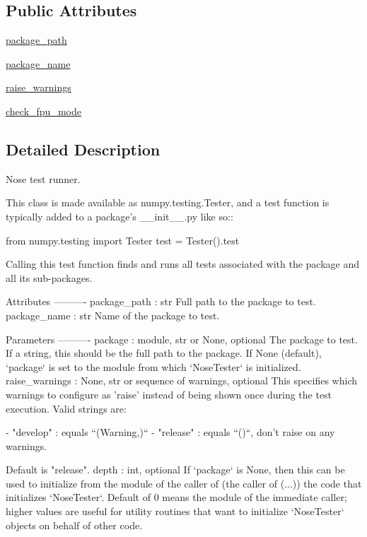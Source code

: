 \subsection*{Public Attributes}
\begin{DoxyCompactItemize}
\item 
\hyperlink{classnumpy_1_1testing_1_1__private_1_1nosetester_1_1NoseTester_ae21b7c07e4ef10572552634510d04c92}{package\+\_\+path}
\item 
\hyperlink{classnumpy_1_1testing_1_1__private_1_1nosetester_1_1NoseTester_ab51a1494d2ffd22593182eb4c5d8f456}{package\+\_\+name}
\item 
\hyperlink{classnumpy_1_1testing_1_1__private_1_1nosetester_1_1NoseTester_a6ea4848c8dc9cde3964f7e58298831a8}{raise\+\_\+warnings}
\item 
\hyperlink{classnumpy_1_1testing_1_1__private_1_1nosetester_1_1NoseTester_a2244951b799d844c57b9a0b19a1bbdb1}{check\+\_\+fpu\+\_\+mode}
\end{DoxyCompactItemize}


\subsection{Detailed Description}
\begin{DoxyVerb}Nose test runner.

This class is made available as numpy.testing.Tester, and a test function
is typically added to a package's __init__.py like so::

  from numpy.testing import Tester
  test = Tester().test

Calling this test function finds and runs all tests associated with the
package and all its sub-packages.

Attributes
----------
package_path : str
    Full path to the package to test.
package_name : str
    Name of the package to test.

Parameters
----------
package : module, str or None, optional
    The package to test. If a string, this should be the full path to
    the package. If None (default), `package` is set to the module from
    which `NoseTester` is initialized.
raise_warnings : None, str or sequence of warnings, optional
    This specifies which warnings to configure as 'raise' instead
    of being shown once during the test execution.  Valid strings are:

      - "develop" : equals ``(Warning,)``
      - "release" : equals ``()``, don't raise on any warnings.

    Default is "release".
depth : int, optional
    If `package` is None, then this can be used to initialize from the
    module of the caller of (the caller of (...)) the code that
    initializes `NoseTester`. Default of 0 means the module of the
    immediate caller; higher values are useful for utility routines that
    want to initialize `NoseTester` objects on behalf of other code.\end{DoxyVerb}
 

